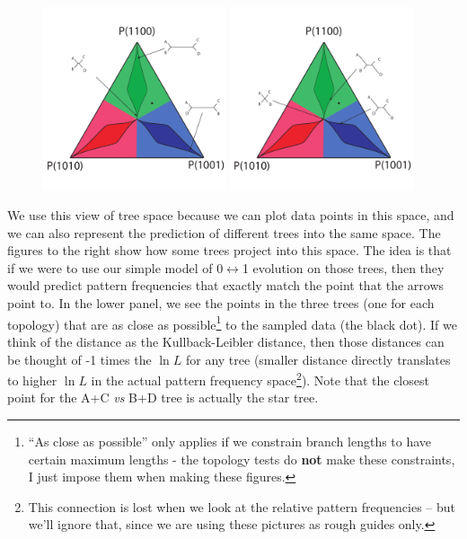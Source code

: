 \documentclass[11pt]{article}
\newcommand{\lnL}{\ln L}
\begin{document}
\begin{figure}
  \begin{center}
   \vspace{-40pt}
    \includegraphics[width=0.48\textwidth]{../newimages/simple-treespace-trees.pdf}
   \vspace{-10pt}
    \includegraphics[width=0.48\textwidth]{../newimages/simple-treespace-trees2.pdf}
    \vspace{-200pt}
  \end{center}
\end{figure}
We use this view of tree space because we can plot data points in this space, and we can also represent the prediction of different trees into the same space.
The figures to the right show how some trees project into this space.  
The idea is that if we were to use our simple model of 0$\leftrightarrow$1 evolution on those trees, then they would predict pattern frequencies that exactly match the point that the arrows point to.
In the lower panel, we see the points in the three trees (one for each topology) that are as close as possible\footnote{``As close as possible'' only applies if we constrain branch lengths to have certain maximum lengths - the topology tests do {\bf not} make these constraints, I just impose them when making these figures.} to the sampled data (the black dot).
If we think of the distance as the Kullback-Leibler distance, then those distances can be thought of -1 times the $\lnL$ for any tree (smaller distance directly translates to higher $\lnL$ in the actual pattern frequency space\footnote{This connection is lost when we look at the relative pattern frequencies -- but we'll ignore that, since we are using these pictures as rough guides only.}).
Note that the closest point for the A+C {\em vs} B+D tree is actually the star tree.
\end{document}

